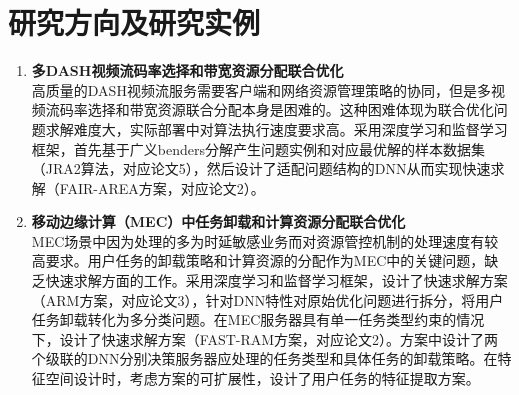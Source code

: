 \documentclass{resume}
\begin{document}
\section{研究方向及研究实例}
\begin{enumerate}
  \item \textbf{多DASH视频流码率选择和带宽资源分配联合优化}
  \\ 高质量的DASH视频流服务需要客户端和网络资源管理策略的协同，但是多视频流码率选择和带宽资源联合分配本身是困难的。这种困难体现为联合优化问题求解难度大，实际部署中对算法执行速度要求高。采用深度学习和监督学习框架，首先基于广义benders分解产生问题实例和对应最优解的样本数据集（JRA2算法，对应论文5），然后设计了适配问题结构的DNN从而实现快速求解（FAIR-AREA方案，对应论文2）。
  \item \textbf{移动边缘计算（MEC）中任务卸载和计算资源分配联合优化}
  \\ MEC场景中因为处理的多为时延敏感业务而对资源管控机制的处理速度有较高要求。用户任务的卸载策略和计算资源的分配作为MEC中的关键问题，缺乏快速求解方面的工作。采用深度学习和监督学习框架，设计了快速求解方案（ARM方案，对应论文3），针对DNN特性对原始优化问题进行拆分，将用户任务卸载转化为多分类问题。在MEC服务器具有单一任务类型约束的情况下，设计了快速求解方案（FAST-RAM方案，对应论文2）。方案中设计了两个级联的DNN分别决策服务器应处理的任务类型和具体任务的卸载策略。在特征空间设计时，考虑方案的可扩展性，设计了用户任务的特征提取方案。
\end{enumerate}
\end{document}
